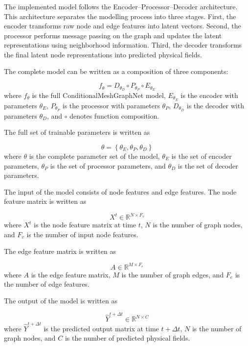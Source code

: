 The implemented model follows the Encoder--Processor--Decoder architecture. This architecture separates the modelling process into three stages. First, the encoder transforms raw node and edge features into latent vectors. Second, the processor performs message passing on the graph and updates the latent representations using neighborhood information. Third, the decoder transforms the final latent node representations into predicted physical fields.

The complete model can be written as a composition of three components:

\begin{equation}
f_{\theta}
=
D_{\theta_D}
\circ
P_{\theta_P}
\circ
E_{\theta_E}
\end{equation}
where \(f_{\theta}\) is the full ConditionalMeshGraphNet model, \(E_{\theta_E}\) is the encoder with parameters \(\theta_E\), \(P_{\theta_P}\) is the processor with parameters \(\theta_P\), \(D_{\theta_D}\) is the decoder with parameters \(\theta_D\), and \(\circ\) denotes function composition.

The full set of trainable parameters is written as

\begin{equation}
\theta
=
\left\{
\theta_E,
\theta_P,
\theta_D
\right\}
\end{equation}
where \(\theta\) is the complete parameter set of the model, \(\theta_E\) is the set of encoder parameters, \(\theta_P\) is the set of processor parameters, and \(\theta_D\) is the set of decoder parameters.

The input of the model consists of node features and edge features. The node feature matrix is written as

\begin{equation}
X^{t}
\in
\mathbb{R}^{N \times F_v}
\end{equation}
where \(X^{t}\) is the node feature matrix at time \(t\), \(N\) is the number of graph nodes, and \(F_v\) is the number of input node features.

The edge feature matrix is written as

\begin{equation}
A
\in
\mathbb{R}^{M \times F_e}
\end{equation}
where \(A\) is the edge feature matrix, \(M\) is the number of graph edges, and \(F_e\) is the number of edge features.

The output of the model is written as

\begin{equation}
\hat{Y}^{t+\Delta t}
\in
\mathbb{R}^{N \times C}
\end{equation}
where \(\hat{Y}^{t+\Delta t}\) is the predicted output matrix at time \(t+\Delta t\), \(N\) is the number of graph nodes, and \(C\) is the number of predicted physical fields.

